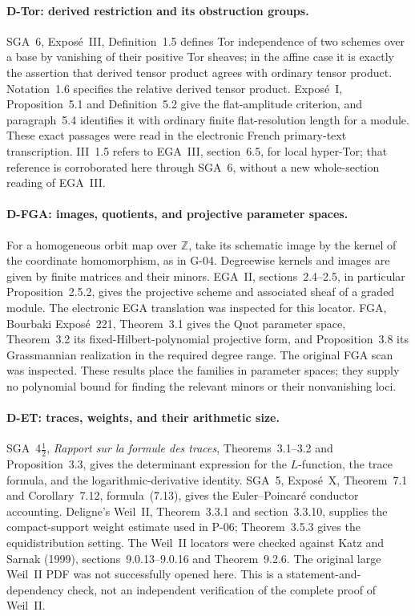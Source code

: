 \documentclass[11pt,a4paper]{article}
\theoremstyle{definition}\newtheorem{definition}{Definition}
\begin{document}
\paragraph{D-Tor: derived restriction and its obstruction groups.}
SGA~6, Expos\'e~III, Definition~1.5 defines Tor independence of two
schemes over a base by vanishing of their positive Tor sheaves; in
the affine case it is exactly the assertion that derived tensor
product agrees with ordinary tensor product. Notation~1.6 specifies
the relative derived tensor product. Expos\'e~I, Proposition~5.1
and Definition~5.2 give the flat-amplitude criterion, and paragraph~5.4
identifies it with ordinary finite flat-resolution length for a
module. These exact passages were read in the electronic French
primary-text transcription. III~1.5 refers to EGA~III, section~6.5,
for local hyper-Tor; that reference is corroborated here through
SGA~6, without a new whole-section reading of EGA~III.

\paragraph{D-FGA: images, quotients, and projective parameter spaces.}
For a homogeneous orbit map over $\mathbb Z$, take its schematic image by the kernel of the coordinate homomorphism, as in G-04. Degreewise kernels and images are given by finite matrices and their minors. EGA~II, sections~2.4--2.5, in particular Proposition~2.5.2, gives the projective scheme and associated sheaf of a graded module. The electronic EGA translation was inspected for this locator. FGA, Bourbaki Expos\'e~221, Theorem~3.1 gives the Quot parameter space, Theorem~3.2 its fixed-Hilbert-polynomial projective form, and Proposition~3.8 its Grassmannian realization in the required degree range. The original FGA scan was inspected. These results place the families in parameter spaces; they supply no polynomial bound for finding the relevant minors or their nonvanishing loci.

\paragraph{D-ET: traces, weights, and their arithmetic size.}
SGA~4$\frac12$, \emph{Rapport sur la formule des traces}, Theorems~3.1--3.2 and Proposition~3.3, gives the determinant expression for the $L$-function, the trace formula, and the logarithmic-derivative identity. SGA~5, Expos\'e~X, Theorem~7.1 and Corollary~7.12, formula~(7.13), gives the Euler--Poincar\'e conductor accounting. Deligne's Weil~II, Theorem~3.3.1 and section~3.3.10, supplies the compact-support weight estimate used in P-06; Theorem~3.5.3 gives the equidistribution setting. The Weil~II locators were checked against Katz and Sarnak (1999), sections~9.0.13--9.0.16 and Theorem~9.2.6. The original large Weil~II PDF was not successfully opened here. This is a statement-and-dependency check, not an independent verification of the complete proof of Weil~II.
\end{document}
